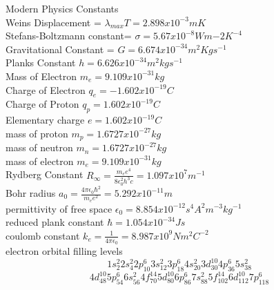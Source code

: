 \documentclass[6pt, oneside]{article}   	%
\begin{document}
Modern Physics Constants\\
Weins Displacement  = $\lambda_{max}T = 2.898x10^{-3} mK$\\
Stefans-Boltzmann constant= $\sigma = 5.67x10^{-8} Wm{-2}K^{-4}$\\
Gravitational Constant = $ G =  6.674x10^{-34}m^2Kgs^{-1}$\\
Planks Constant $h=6.626x10^{-34}m^2kgs^{-1}$\\
Mass of Electron $m_e=9.109x10^{-31}kg$\\
Charge of Electron $q_e = -1.602x10^{-19}C$\\
Charge of Proton $q_p = 1.602x10^{-19}C$\\
Elementary charge $e= 1.602x10^{-19}C$\\
mass of proton $m_p=1.6727x10^{-27}kg$\\
mass of neutron $m_n=1.6727x10^{-27}kg$\\
mass of electron $m_e=9.109x10^{-31}kg$\\
Rydberg Constant $R_{\infty}= \frac{m_e e^4}{8\epsilon_0^2 h^3 c} = 1.097x10^{7} m^{-1}$\\
Bohr radius $a_0 =\frac{4\pi \epsilon_0 \hbar^2}{m_e e^2} = 5.292x10^{-11}m$\\
permittivity of free space $\epsilon_0 = 8.854x10^{-12} s^4A^2m^{-3}kg^{-1}$\\
reduced plank constant  $\hbar = 1.054x10^{-34} J s$\\
coulomb constant  $k_e = \frac{1}{4\pi \epsilon_0} = 8.987x10^9 Nm^2C^{-2}$\\ 
electron orbital filling levels\\
\[
1s_{2}^{2} 
2s_{4}^{2} 
2p_{10}^6 
3s_{12}^{2}
3p_{18}^{6}
4s_{20}^2
3d_{30}^{10}
4p_{36}^{6}
5s_{38}^{2}
\]
\[
4d_{48}^{10}
5p_{54}^{6}
6s_{56}^{2}
4f_{70}^{14}
5d_{80}^{10}
6p_{86}^{6}
7s_{88}^{2}
5f_{102}^{14}
6d_{112}^{10}
7p_{118}^{6}
\]






\end{document}
